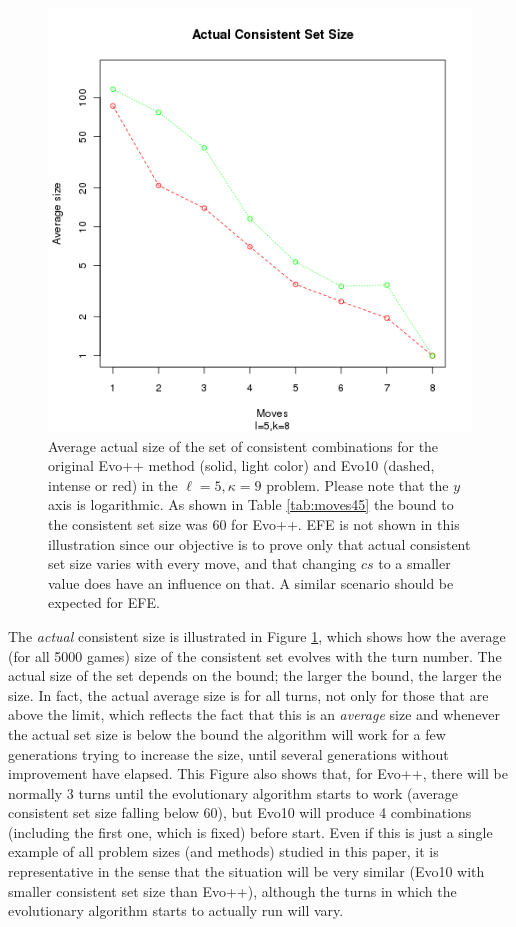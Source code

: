 \documentclass[conference]{IEEEtran}
\begin{document}
%
\begin{figure}[!h]
\centering
\includegraphics[scale=0.50]{cset-size.png}
\caption{Average actual size of the set of consistent combinations for the original Evo++ method (solid, light
  color) and Evo10 (dashed, intense or red) in the $\ell=5, \kappa=9$ problem.  Please note that the
  $y$ axis is logarithmic. As shown in Table \ref{tab:moves45} the
  bound to the consistent set size was 60 for
  Evo++.  EFE is not shown in this illustration since our objective
  is to prove only that actual consistent set size varies with every
  move, and that changing $cs$ to a smaller value does have an
  influence on that. A similar scenario should be expected for EFE.\label{fig:csize}} 
\end{figure} 
%
The {\em actual} consistent size is
illustrated in Figure \ref{fig:csize}, 
which shows how the average
(for all 5000 games) size of the consistent set evolves with the turn
number. The actual size of the set depends on the bound; the larger
the bound, the larger the size. In fact, the actual average size is for all
turns, not only for those that are above the limit, which reflects
the fact that this is an {\em average} size and whenever the actual
set size is below the bound the algorithm will work for a few
generations trying to increase the size, until several generations
without improvement have elapsed. This Figure also shows that, for
Evo++, there will be normally 3 turns until the evolutionary algorithm
starts to work (average consistent set size falling below 60), but
Evo10 will produce 4 combinations (including the first one, which is
fixed) before start. Even if this is just a single example of all
problem sizes (and methods) studied in this paper, it is representative in the sense
that the situation will be very similar (Evo10 with smaller consistent
set size than Evo++), although the turns in which the evolutionary
algorithm starts to actually run will vary. 
\end{document}
